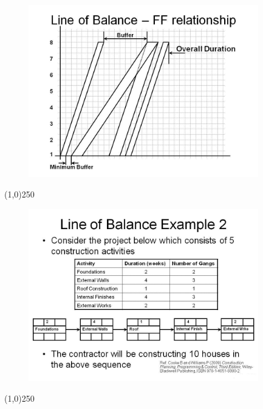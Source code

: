 \begin{frame}
\begin{figure}
	\centering
		\includegraphics[width = 10.0cm]{oldnotes/Slide255.jpg}
\end{figure}
\end{frame}
\begin{center}\line(1,0){250}\end{center}






\begin{frame}
\begin{figure}
	\centering
		\includegraphics[width = 10.0cm]{oldnotes/Slide256.jpg}
\end{figure}
\end{frame}
\begin{center}\line(1,0){250}\end{center}






